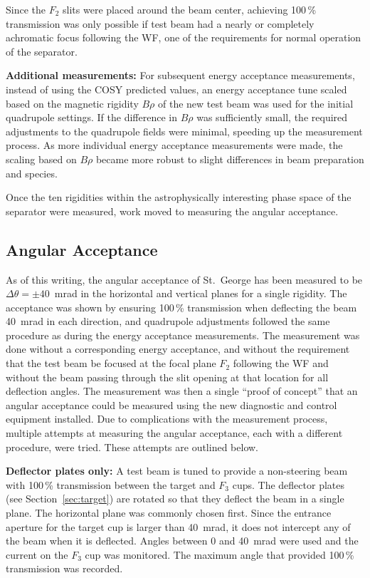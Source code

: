 Since the $F_2$ slits were placed around the beam center, achieving
100\,\% transmission was only possible if test beam had a nearly or
completely achromatic focus following the WF, one of the requirements
for normal operation of the separator.

\textbf{Additional measurements:}
For subsequent energy acceptance measurements, instead of using the COSY
predicted values, an energy acceptance tune scaled based on the magnetic
rigidity $B\rho$ of the new test beam was used for the initial
quadrupole settings. If the difference in $B\rho$ was sufficiently
small, the required adjustments to the quadrupole fields were minimal,
speeding up the measurement process. As more individual energy
acceptance measurements were made, the scaling based on $B\rho$ became
more robust to slight differences in beam preparation and species.

Once the ten rigidities within the astrophysically interesting phase
space of the separator were measured, work moved to measuring the
angular acceptance.


\subsection{Angular Acceptance}

As of this writing, the angular acceptance of St.\ George has been
measured to be $\Delta\theta = \pm 40$~mrad in the horizontal and
vertical planes for a single rigidity. The acceptance was shown by
ensuring 100\,\% transmission when deflecting the beam 40~mrad in each
direction, and quadrupole adjustments followed the same procedure as
during the energy acceptance measurements. The measurement was done
without a corresponding energy acceptance, and without the requirement
that the test beam be focused at the focal plane $F_2$ following the WF
and without the beam passing through the slit opening at that location
for all deflection angles. The measurement was then a single ``proof of
concept'' that an angular acceptance could be measured using the new
diagnostic and control equipment installed. Due to complications with
the measurement process, multiple attempts at measuring the angular
acceptance, each with a different procedure, were tried. These attempts
are outlined below.

\textbf{Deflector plates only:}
A test beam is tuned to provide a non-steering beam with 100\,\%
transmission between the target and $F_3$ cups. The deflector plates
(see Section~\ref{sec:target}) are rotated so that they deflect the beam
in a single plane. The horizontal plane was commonly chosen first. Since
the entrance aperture for the target cup is larger than 40~mrad, it does
not intercept any of the beam when it is deflected. Angles between 0 and
40~mrad were used and the current on the $F_3$ cup was monitored. The
maximum angle that provided 100\,\% transmission was recorded.

